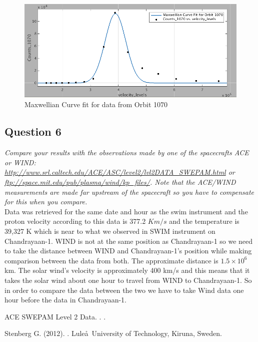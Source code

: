 \documentclass{article}
\begin{document}
\begin{figure}
\centering
\includegraphics[scale= 0.45]{Figures/curvefit_1070.png}
\caption{Maxwellian Curve fit for data from Orbit 1070}
\label{fig:curvefit_1070}
\end{figure}

\subsection{Question 6}
\textit{Compare your results with the observations made by one of the spacecrafts ACE or WIND: \url{http://www.srl.caltech.edu/ACE/ASC/level2/lvl2DATA_SWEPAM.html} or \url{ftp://space.mit.edu/pub/plasma/wind/kp_files/}. Note that the ACE/WIND measurements are made far upstream of the spacecraft so you have to compensate for this when you compare.}\\

Data was retrieved for the same date and hour as the swim instrument and the proton velocity according to this data is 377.2 $Km/s$ and the temperature is 39,327 K which is near to what we observed in SWIM instrument on Chandrayaan-1. WIND is not at the same position as Chandrayaan-1 so we need to take the distance between WIND and Chandrayaan-1's position while making comparison between the data from both. The approximate distance is $1.5\times10^6$ km. The solar wind’s velocity is approximately 400 km/s and this means that it takes the solar wind about one hour to travel from WIND to Chandrayaan-1. So in order to compare the data between the two we have to take Wind data one hour before the data in Chandrayaan-1.


	
\clearpage


\newpage
\begin{thebibliography}{9}

ACE SWEPAM Level 2 Data.
.
.

Stenberg G.  (2012).
.
\newblock Lule\aa \ University of Technology, Kiruna, Sweden.

\end{thebibliography}
\end{document}
